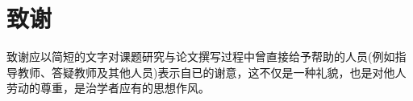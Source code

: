 \section*{致\quad 谢}
\renewcommand{\baselinestretch}{1.5}
致谢应以简短的文字对课题研究与论文撰写过程中曾直接给予帮助的人员(例如指导教师、答疑教师及其他人员)表示自已的谢意，这不仅是一种礼貌，也是对他人劳动的尊重，是治学者应有的思想作风。\par